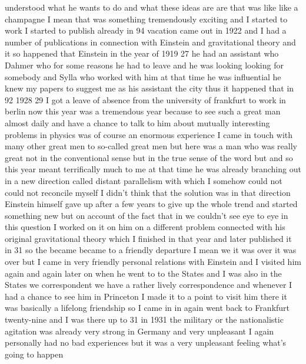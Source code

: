 \documentclass{article}
\begin{document}
understood what he wants to do and what these ideas are are that was like like a champagne I mean that was something tremendously exciting and I started to work I started to publish already in 94 vacation came out in 1922 and I had a number of publications in connection with Einstein and gravitational theory and it so happened that Einstein in the year of 1919 27 he had an assistant who Dahmer who for some reasons he had to leave and he was looking looking for somebody and Sylla who worked with him at that time he was influential he knew my papers to suggest me as his assistant the city thus it happened that in 92 1928 29 I got a leave of absence from the university of frankfurt to work in berlin now this year was a tremendous year because to see such a great man almost daily and have a chance to talk to him about mutually interesting problems in physics was of course an enormous experience I came in touch with many other great men to so-called great men but here was a man who was really great not in the conventional sense but in the true sense of the word but and so this year meant terrifically much to me at that time he was already branching out in a new direction called distant parallelism with which I somehow could not could not reconcile myself I didn't think that the solution was in that direction Einstein himself gave up after a few years to give up the whole trend and started something new but on account of the fact that in we couldn't see eye to eye in this question I worked on it on him on a different problem connected with his original gravitational theory which I finished in that year and later published it in 31 so the became became to a friendly departure I mean we it was over it was over but I came in very friendly personal relations with Einstein and I visited him again and again later on when he went to to the States and I was also in the States we correspondent we have a rather lively correspondence and whenever I had a chance to see him in Princeton I made it to a point to visit him there it was basically a lifelong friendship so I came in in again went back to Frankfurt twenty-nine and I was there up to 31 in 1931 the military or the nationalistic agitation was already very strong in Germany and very unpleasant I again personally had no bad experiences but it was a very unpleasant feeling what's going to happen
\end{document}
